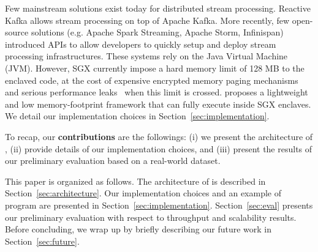 Few mainstream solutions exist today for distributed stream processing.
Reactive Kafka\cite{reactivekafka} allows stream processing on top of Apache Kafka\cite{apachekafka}.
More recently, few open-source solutions (e.g. Apache Spark Streaming\cite{apachesparkstreaming}, Apache Storm\cite{apachestorm}, Infinispan\cite{infinispan}) introduced APIs to allow developers to quickly setup and deploy stream processing infrastructures.
These systems rely on the Java Virtual Machine (JVM)\cite{lindholm2014java}.
However, SGX currently impose a hard memory limit of 128 MB to the enclaved code, at the cost of expensive encrypted memory paging mechanisms and serious performance leaks~\cite{brenner_securekeeper:_2016} when this limit is crossed.
\SYS proposes a lightweight and low memory-footprint framework that can fully execute inside SGX enclaves.
We detail our implementation choices in Section~\ref{sec:implementation}.

To recap, our \textbf{contributions} are the followings: (i) we present the architecture of \SYS, (ii) provide details of our implementation choices, and (iii) present the results of our preliminary evaluation based on a real-world dataset.

This paper is organized as follows.
The architecture of \SYS is described in Section~\ref{sec:architecture}.
Our implementation choices and an example of \SYS program are presented in Section~\ref{sec:implementation}.
Section~\ref{sec:eval} presents our preliminary evaluation with respect to throughput and scalability results.
Before concluding, we wrap up by briefly describing our future work in Section~\ref{sec:future}.
